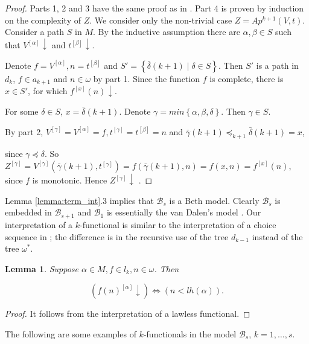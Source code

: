 \documentclass{asl}
\newtheorem{lemma}{Lemma}[section]
\theoremstyle{definition}
\begin{document}
\begin{proof}
Parts 1, 2 and 3 have the same proof as in \cite{kach13}. Part 4 is proven by induction on the complexity of $ Z$. We consider only the non-trivial case $ Z=Ap^{k+1}(V,t) $. Consider a path $ S $ in $ M $. By the inductive assumption there are $ \alpha, \beta \in S $ such that $V^{[\alpha]}\downarrow $ and $ t^{[\beta]}\downarrow $. 
\medskip

Denote
$ f=V^{[\alpha]}, n= t^{[\beta]}$ and $ S'=\left\lbrace \bar{\delta}(k+1)\mid\delta\in S \right\rbrace $. Then $ S' $ is a path in $d_{k}$, $f \in a_{k+1}$ and $ n \in \omega$ by part 1.  
\medskip
\noindent Since the function $ f $ is complete, there is $ x \in S' $, for which $ f^{[x]}(n)\downarrow $. 

\medskip
For some $ \delta\in S$, $x= \bar{\delta}(k+1)$. Denote $ \gamma=min\left\lbrace \alpha,\beta,\delta \right\rbrace$. Then $\gamma\in S$. 

\medskip
By part 2, $ V^{[\gamma]}=V^{[\alpha]}=f , t^{[\gamma]}=t^{[\beta]}=n$ and 
$\bar{\gamma}(k+1)\preccurlyeq_{k+1} \bar{\delta}(k+1)=x$,

\medskip
\noindent since $\gamma\preccurlyeq\delta$. So $ Z^{[\gamma]} = V^{[\gamma]}(\bar{\gamma}(k+1), t^{[\gamma]}) =f(\bar{\gamma}(k+1), n)=f(x,n)=f^{[x]}(n) $, since $ f $ is monotonic. 
Hence $ Z^{[\gamma]}\downarrow $ .
\medskip
\end{proof}

Lemma \ref{lemma:term_int}.3 implies that  $\mathcal{B}_s$ is a Beth model. Clearly  $\mathcal{B}_s$ is embedded in  $\mathcal{B}_{s+1}$ and  $\mathcal{B}_1$ is essentially the van Dalen's model \cite{vand78}. Our interpretation of a $ k $-functional is similar to the interpretation of a choice sequence in \cite{vand78}; the difference is in the recursive use of the tree $d_{k-1}$ instead of the tree $ \omega ^{*} $.

\begin{lemma} 
Suppose $ \alpha\in M, f \in l_{k}, n\in\omega$. Then 

\[ (f(n)^{[\alpha]}\downarrow)   \Leftrightarrow (n < lh(\alpha)).\] 
\label{lemma:lawless1} 
\end{lemma}
\begin{proof}
It follows from the interpretation of a lawless functional.
\end{proof} 

The following are some examples of $ k $-functionals in the model $\mathcal{B}_s$, $k=1,\ldots,s$.
\end{document}
